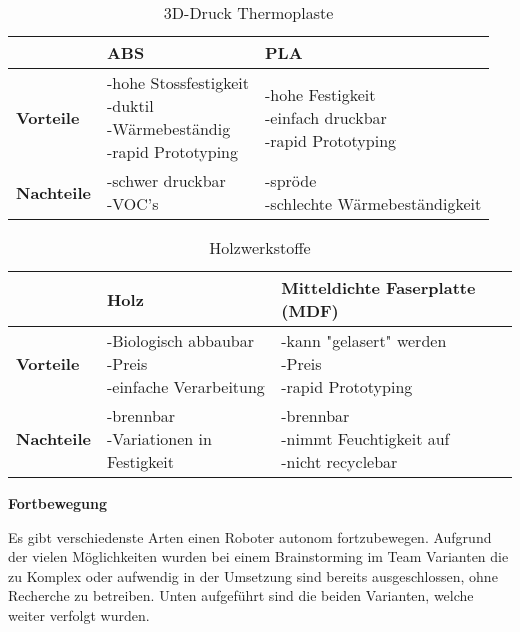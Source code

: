\begin{table}[H]
\centering
\small
\begin{tabularx}{\textwidth}{|l|X|X|}
\hline
  \textbf{} & \textbf{ABS} & \textbf{PLA} \\
  \hline
  \textbf{Vorteile}  & \makecell{-hohe Stossfestigkeit\\ -duktil \\ -Wärmebeständig \\ -rapid Prototyping} & \makecell{-hohe Festigkeit \\-einfach druckbar\\ -rapid Prototyping}\\
  \hline
  \textbf{Nachteile} & \makecell{-schwer druckbar \\ -VOC's  \\} & \makecell{-spröde\\-schlechte Wärmebeständigkeit}\\
  \hline
\end{tabularx}
\caption{3D-Druck Thermoplaste}
\label{table:fdm-thermoplasts-comparison}
\end{table}


\begin{table}[H]
\centering
\small
\begin{tabularx}{\textwidth}{|l|X|X|}
\hline
  \textbf{} & \textbf{Holz} & \textbf{Mitteldichte Faserplatte (MDF)} \\
  \hline
  \textbf{Vorteile}  & \makecell{-Biologisch abbaubar\\ -Preis \\ -einfache Verarbeitung} & \makecell{-kann "gelasert"  werden \\-Preis\\ -rapid Prototyping}\\
  \hline
  \textbf{Nachteile} & \makecell{-brennbar \\ -Variationen in Festigkeit} & \makecell{-brennbar\\-nimmt Feuchtigkeit auf\\-nicht recyclebar}\\
  \hline
\end{tabularx}
\caption{Holzwerkstoffe}
\label{table:woods-comparison}
\end{table}

\newpage


\textbf{Fortbewegung}

Es gibt verschiedenste Arten einen Roboter autonom fortzubewegen. Aufgrund der vielen Möglichkeiten wurden bei einem Brainstorming im Team Varianten die zu Komplex oder aufwendig in der Umsetzung sind bereits ausgeschlossen, ohne Recherche zu betreiben. Unten aufgeführt sind die beiden Varianten, welche weiter verfolgt wurden.

